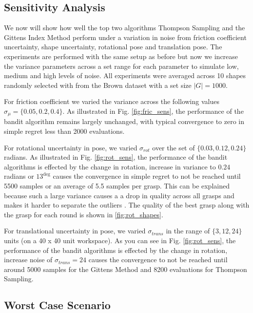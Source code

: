 \documentclass[journal,transmag]{IEEEtran}%
\begin{document}


\subsection{Sensitivity Analysis }
We now will show how well the top two algorithms Thompson Sampling and the Gittens Index Method perform under a variation in noise from friction coefficient uncertainty, shape uncertainty, rotational pose and translation pose. The experiments are performed with the same setup as before but now we increase the variance parameters across a set range for each parameter to simulate low, medium and high levels of noise. All experiments were averaged across 10 shapes randomly selected with from the Brown dataset with a set size $|G| = 1000$. 

For friction coefficient we varied the variance across the following values $\sigma_{\mu} = \lbrace 0.05, 0.2, 0.4 \rbrace$. As illustrated in Fig. \ref{fig:fric_sens}, the performance of the bandit algorithm remains largely unchanged, with typical convergence to zero in simple regret less than 2000 evaluations.

For rotational uncertainty in pose, we varied $\sigma_{rot}$ over the set of $\lbrace 0.03, 0.12,0.24\rbrace$ radians. As illustrated in Fig. \ref{fig:rot_sens}, the performance of the bandit algorithms is effected by the change in rotation, increase in variance to $0.24$ radians or $13^{\deg}$  causes the convergence in simple regret to not be reached until 5500 samples or an average of 5.5 samples per grasp. This can be explained because such a large variance causes a a drop in quality across all grasps and makes it harder to separate the outliers \cite{gabillon2012bes}. The quality of the best grasp along with the grasp for each round is shown in \ref{fig:rot_shapes}. 


For translational uncertainty in pose, we varied $\sigma_{trans}$ in the range of $\lbrace 3,12, 24 \rbrace$ units (on a 40 x 40 unit workspace). As you can see in Fig. \ref{fig:rot_sens}, the performance of the bandit algorithms is effected by the change in rotation, increase noise of $\sigma_{trans} = 24$ causes the convergence to not be reached until around 5000 samples for the Gittens Method and  8200 evaluations for Thompson Sampling.



\subsection{Worst Case Scenario}
\end{document}
